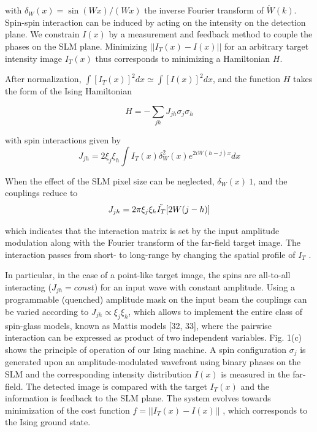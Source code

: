 with $\delta_W(x) = \sin(Wx) / (Wx)$ the inverse Fourier transform of $\tilde{W} (k)$. Spin-spin interaction can be induced by acting on the intensity on the detection plane. We constrain $I(x)$ by a measurement and feedback method to couple the phases on the SLM plane. Minimizing $||I_T (x) - I(x)||$ for an arbitrary target intensity image $I_T (x)$ thus corresponds to minimizing a Hamiltonian $H$.

After normalization, $\int [I_T(x)]^2 dx \simeq  \int [I(x)]^2 dx$, and the
function $H$ takes the form of the Ising Hamiltonian

\begin{equation}
    H = - \sum_{jh} J_{jh} \sigma_j \sigma_h
\end{equation}

with spin interactions given by
\begin{equation}
 J_{jh} = 2 \xi_j \xi_h \int I_T(x) \delta_W^2(x) e^{2iW(h-j)x} dx
\end{equation}

When the effect of the SLM pixel size can be neglected, $\delta_W(x) ~ 1$, and the couplings reduce to
\begin{equation}
 J_{jh} = 2 \pi  \xi_j \xi_h  \Tilde{I_T} [2W(j-h)]   
\end{equation}

which indicates that the interaction matrix is set by the input amplitude modulation along with the Fourier transform of the far-field target image. The interaction passes from short- to long-range by changing the spatial profile of $I_T$ .

In particular, in the case of a point-like target image, the spins are all-to-all interacting ($J_{jh} = const$) for an input wave with constant amplitude. Using a programmable (quenched) amplitude mask on the input beam the couplings can be varied according to $J_{jh} \propto \xi_j\xi_h$, which allows to implement the entire class of spin-glass models, known as Mattis models [32, 33], where the pairwise interaction can be expressed as product of two independent variables. Fig. 1(c) shows the principle of operation of our Ising machine. A spin configuration ${\sigma_j}$ is generated upon an amplitude-modulated wavefront using binary phases on the SLM and the corresponding intensity distribution $I(x)$ is measured in the far-field. The detected image is compared with the target $I_T (x)$ and the information is feedback to the SLM plane. The system evolves towards minimization of the cost function $f = ||I_T (x) - I(x)||$ , which corresponds to the Ising ground state.

